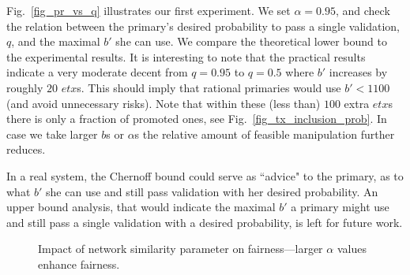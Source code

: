 Fig.~\ref{fig_pr_vs_q} illustrates our first experiment. We set $\alpha=0.95$, and check the relation between the primary's desired probability to pass a single validation, $q$, and the maximal $b'$ she can use. We compare the theoretical lower bound to the experimental results. It is interesting to note that the practical results indicate a very moderate decent from $q=0.95$ to $q=0.5$ where $b'$ increases by roughly $20$ $etx$s. This should imply that rational primaries would use $b'<1100$ (and avoid unnecessary risks). Note that within these (less than) $100$ extra $etx$s there is only a fraction of promoted ones, see Fig.~\ref{fig_tx_inclusion_prob}. In case we take larger $b$s or $\alpha$s the relative amount of feasible manipulation further reduces.

In a real system, the Chernoff bound could serve as ``advice" to the primary, as to what $b'$ she can use and still pass validation with her desired probability. An upper bound analysis, that would indicate the maximal $b'$ a primary might use and still pass a single validation with a desired probability, is left for future work.

\begin{figure}[t!]
\caption{Impact of network similarity parameter on fairness---larger $\alpha$ values enhance fairness.}
 \label{fig_ratio_vs_alpha}
\end{figure}

